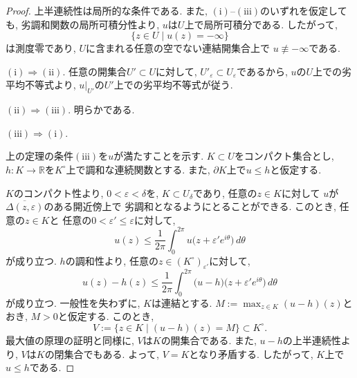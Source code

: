 \documentclass[dvipdfmx,a4paper,11pt]{report} %
\theoremstyle{definition}
\theoremstyle{remark}
\numberwithin{equation}{section}
\newcommand{\R}{\mathbb{R}}
\begin{document}
\begin{proof}
上半連続性は局所的な条件である.
また, $\mathrm{(i)}$--$\mathrm{(iii)}$のいずれを仮定しても,
劣調和関数の局所可積分性より, $u$は$U$上で局所可積分である.
したがって,
\[
\{z \in U \mid u(z)=-\infty\}
\]
は測度零であり,
$U$に含まれる任意の空でない連結開集合上で
$u \not\equiv -\infty$である.

$\mathrm{(i)} \Rightarrow \mathrm{(ii)}$.
任意の開集合$U' \subset U$に対して,
$U'_\varepsilon \subset U_\varepsilon$であるから,
$u$の$U$上での劣平均不等式より,
$u|_{U'}$の$U'$上での劣平均不等式が従う.

$\mathrm{(ii)} \Rightarrow \mathrm{(iii)}$.
明らかである.

$\mathrm{(iii)} \Rightarrow \mathrm{(i)}$.

上の定理の条件$\mathrm{(iii)}$を$u$が満たすことを示す.
$K \subset U$をコンパクト集合とし,
$h \colon K \to \R$を$K^\circ$上で調和な連続関数とする.
また, $\partial K$上で$u \leq h$と仮定する.

$K$のコンパクト性より, $0<\varepsilon<\delta$を,
$K \subset U_\delta$であり, 任意の$z \in K$に対して
$u$が$\overline{\Delta(z,\varepsilon)}$のある開近傍上で
劣調和となるようにとることができる.
このとき, 任意の$z \in K$と
任意の$0<\varepsilon' \leq \varepsilon$に対して,
\[
u(z)
\leq
\frac{1}{2\pi}
\int_0^{2\pi}
u\bigl(z+\varepsilon' e^{i\theta}\bigr)\,d\theta
\]
が成り立つ.
$h$の調和性より, 任意の$z \in (K^\circ)_{\varepsilon'}$に対して,
\[
u(z)-h(z)
\leq
\frac{1}{2\pi}
\int_0^{2\pi}
\bigl(u-h\bigr)\bigl(z+\varepsilon' e^{i\theta}\bigr)\,d\theta
\]
が成り立つ.
一般性を失わずに, $K$は連結とする.
$M:=\max_{z \in K}(u-h)(z)$とおき, $M>0$と仮定する.
このとき,
\[
V:=\{z \in K \mid (u-h)(z)=M\} \subset K^\circ.
\]
最大値の原理の証明と同様に, $V$は$K$の開集合である.
また, $u-h$の上半連続性より, $V$は$K$の閉集合でもある.
よって, $V=K$となり矛盾する.
したがって, $K$上で$u \leq h$である.
\end{proof}
\end{document}
